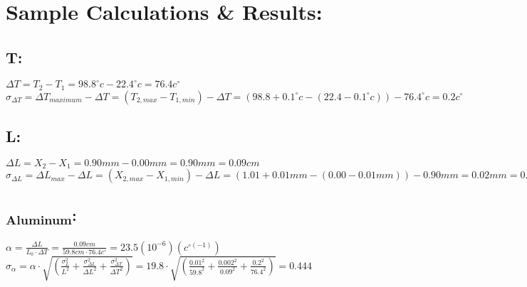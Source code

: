\documentclass[10pt,letterpaper]{report}
\begin{document}
\newpage

\section*{Sample Calculations \& Results:}
\subsection*{\textDelta T:}
$\Delta T = T_2 - T_1 = 98.8 ^\circ c - 22.4 ^\circ c = 76.4 c ^\circ$ \\
$\sigma_{\Delta T} = \Delta T_{maximum} - \Delta T = (T_{2, max} - T_{1, min}) - \Delta T = 
(98.8 + 0.1 ^\circ c - (22.4 - 0.1 ^\circ c)) - 76.4 ^\circ c = 0.2 c ^\circ$ \\ [-0.65em]
\subsection*{\textDelta L:}
$\Delta L = X_2 - X_1 = 0.90 mm - 0.00 mm = 0.90 mm = 0.09 cm$ \\
$\sigma_{\Delta L} = \Delta L_{max} - \Delta L = (X_{2, max} - X_{1, min}) - \Delta L = 
(1.01 + 0.01 mm - (0.00 - 0.01 mm)) - 0.90 mm = 0.02 mm = 0.002 cm $ \\ [-0.65em]
\subsection*{\textalpha\textsubscript{Aluminum}:}
$\alpha = \frac{\Delta L}{L_0 \cdot \Delta T} = \frac{0.09 cm}{59.8 cm \cdot 76.4 c^\circ} = 23.5 (10^{-6}) (c^{\circ (-1)}) $ \\
$\sigma_{\alpha} = \alpha \cdot \sqrt{(\frac{\sigma_L^2}{L^2} + \frac{\sigma_{\Delta L}^2}{\Delta L^2} +
 \frac{\sigma_{\Delta T}^2}{\Delta T^2})} = 19.8 \cdot \sqrt{(\frac{0.01^2}{59.8^2} + \frac{0.002^2}{0.09^2} +
 \frac{0.2^2}{76.4^2})} = 0.444$
\end{document}
